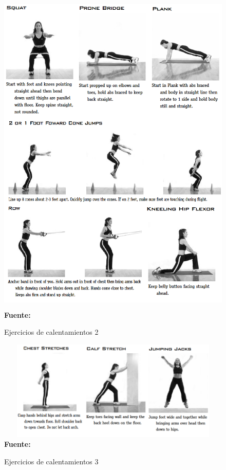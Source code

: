 \begin{figure}[H]
	\caption{Ejercicios de calentamientos 2}
	\label{fig:anxWarmup2}
	\centering
	\includegraphics[width=430px,height=600px]{graphics/warmup2.PNG} \\
	\textbf{Fuente:} 
\end{figure}

\begin{figure}[H]
	\caption{Ejercicios de calentamientos 3}
	\label{fig:anxWarmup3}
	\centering
	\includegraphics[width=430px,height=180px]{graphics/warmup3.PNG} \\
	\textbf{Fuente:} 
\end{figure}

